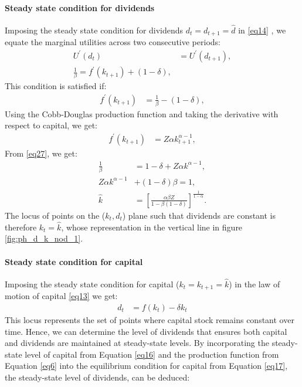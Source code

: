 \documentclass[12pt]{report}
\begin{document}
\paragraph{Steady state condition for dividends}
Imposing the steady state condition for dividends \( d_t = d_{t+1} = \widehat{d} \) in \ref{eq14} , we
equate the marginal  utilities across two consecutive periods:
\begin{align}
    U^{\prime}(d_t) &= U^{\prime}(d_{t+1}), \nonumber \\
    \frac{1}{\beta} = f^{\prime}(k_{t+1}) + (1-\delta),\label{eq27}
\end{align}
This condition is satisfied if:
\begin{align}
    f^{\prime}(k_{t+1}) &= \frac{1}{\beta} - (1-\delta), 
\end{align}
Using the Cobb-Douglas production function and taking the derivative with respect to capital, we get:
\begin{align}
    f^{\prime}(k_{t+1}) &= Z \alpha k^{\alpha-1}_{t+1},  \label{eq15'}
\end{align}
From \ref{eq27}, we get: 
\begin{align}
    \frac{1}{\beta}&=1-\delta+Z\alpha k^{\alpha-1},\nonumber \\
    Z\alpha k^{\alpha-1} &+(1-\delta)\beta=1, \nonumber \\
    \widehat{k} &= \left[\frac{\alpha \beta Z}{1 - \beta\left(1-\delta\right)}\right]^{\frac{1}{1-\alpha}}.  \label{eq16}
\end{align}
The locus of points on the (\(k_t,d_t\)) plane such that dividends are constant is therefore
\(k_t=\hat{k}\), whose representation in the vertical line in figure \ref{fig:ph_d_k_nod_1}.
\paragraph{Steady state condition for capital}
Imposing the steady state condition for capital (\(k_t = k_{t+1} = \widehat{k}\)) in the law of motion of capital \ref{eq13} we
get:
\begin{align}
    d_t & = f(k_t) - \delta k_t  \label{eq17}
\end{align}
This locus represents the set of points where capital stock remains constant over time. Hence, we can determine the
level of dividends that ensures both capital and dividends are maintained at steady-state levels. By incorporating the
steady-state level of capital  from Equation \ref{eq16} and the production function from Equation \ref{eq6} into the equilibrium
condition for capital from Equation \ref{eq17}, the steady-state level of dividends, can be
deduced:
\end{document}
